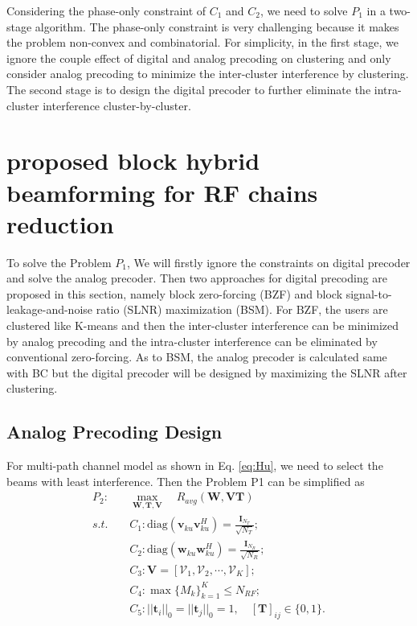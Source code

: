 \documentclass[conference]{IEEEtran}
\begin{document}
Considering the phase-only constraint of $C_1$ and $C_2$, we need to solve $P_1$ in a two-stage algorithm. The phase-only constraint is very challenging because it makes the problem non-convex and combinatorial. For simplicity,  in the first stage, we ignore the couple effect of digital and analog precoding on clustering and only consider analog precoding to minimize the inter-cluster interference by clustering. The second stage is to design the digital precoder to further eliminate the intra-cluster interference cluster-by-cluster.



\section{proposed block hybrid beamforming for RF chains reduction}
To solve the Problem $P_1$, We will firstly ignore the constraints on digital precoder and solve the analog precoder. Then two approaches for digital precoding are proposed in this section, namely block zero-forcing (BZF) and block signal-to-leakage-and-noise ratio (SLNR) maximization (BSM). For BZF, the users are clustered like K-means and then the inter-cluster interference can be minimized by analog precoding and the intra-cluster interference can be eliminated by conventional zero-forcing. As to BSM, the analog precoder is calculated same with BC but the digital precoder will be designed by maximizing the SLNR after clustering.

\subsection{Analog Precoding Design}

For multi-path channel model as shown in Eq. \eqref{eq:Hu}, we need to select the beams with least interference. Then the Problem P1 can be simplified as 
\begin{align}\label{eq:analog}
P_2: \quad&\max_{\bm W, \bm T, \bm{V}}\quad R_{avg}(\bm{W},\bm{VT})\\ \nonumber
s.t. \quad&C_1: \text{diag}(\bm{v}_{ku}\bm{v}_{ku}^H)=\frac{\bm{I}_{N_T}}{\sqrt{N_T}};\\
&C_2: \text{diag}(\bm{w}_{ku}\bm{w}_{ku}^H)=\frac{\bm{I}_{N_{R}}}{\sqrt{N_R}};\nonumber\\
&C_3: \bm{V} = [\bm{\mathcal{V}}_1, \bm{\mathcal{V}}_2, \cdots, \bm{\mathcal{V}}_K];\nonumber\\
&C_4: \max \{M_k\}_{k=1}^K \leq N_{RF};\nonumber\\
&C_5: ||\bm{t}_{i}||_0=||\bm{t}_{j}||_0=1, \quad [\bm{T}]_{ij}\in\{0,1\}.\nonumber
\end{align}
\end{document}
